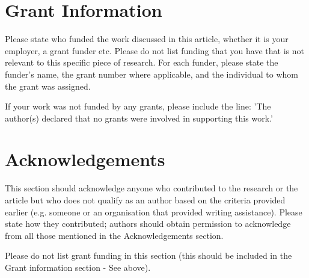 \documentclass[10pt]{article}
\begin{document}
\section*{Grant Information}
Please state who funded the work discussed in this article, whether it is your employer, a grant funder etc. Please do not list funding that you have that is not relevant to this specific piece of research. For each funder, please state the funder{'}s name, the grant number where applicable, and the individual to whom the grant was assigned.

If your work was not funded by any grants, please include the line: {'}The author(s) declared that no grants were involved in supporting this work.{'}

\section*{Acknowledgements}
This section should acknowledge anyone who contributed to the research or the
article but who does not qualify as an author based on the criteria provided earlier
(e.g. someone or an organisation that provided writing assistance). Please state how
they contributed; authors should obtain permission to acknowledge from all those
mentioned in the Acknowledgements section.

Please do not list grant funding in this section (this should be included in the Grant information section - See above).
\end{document}
